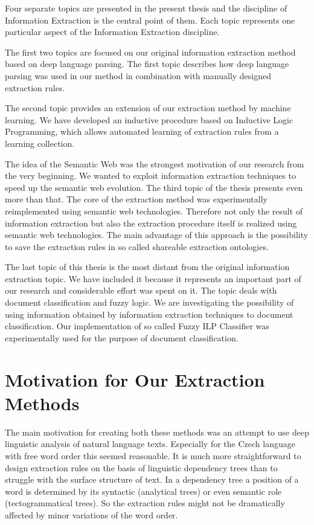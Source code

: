 
Four separate topics are presented in the present thesis and the discipline of Information Extraction is the central point of them. Each topic represents one particular aspect of the Information Extraction discipline.

The first two topics are focused on our original information extraction method based on deep language parsing. The first topic describes how deep language parsing was used in our method in combination with manually designed extraction rules.

The second topic provides an extension of our extraction method by machine learning. We have developed an inductive procedure based on Inductive Logic Programming, which allows automated learning of extraction rules from a learning collection.

The idea of the Semantic Web was the strongest motivation of our research from the very beginning. We wanted to exploit information extraction techniques to speed up the semantic web evolution. The third topic of the thesis presents even more than that. The core of the extraction method was experimentally reimplemented using semantic web technologies. Therefore not only the result of information extraction but also the extraction procedure itself is realized using semantic web technologies. The main advantage of this approach is the possibility to save the extraction rules in so called shareable extraction ontologies.

The last topic of this thesis is the most distant from the original information extraction topic. We have included it because it represents an important part of our research and considerable effort was spent on it. The topic deals with document classification and fuzzy logic. We are investigating the possibility of using information obtained by information extraction techniques to document classification. Our implementation of so called Fuzzy ILP Classifier was experimentally used for the purpose of document classification.

\section{Motivation for Our Extraction Methods}

The main motivation for creating both these methods was an attempt to use deep linguistic analysis of natural language texts. Especially for the Czech language with free word order this seemed reasonable. It is much more straightforward to design extraction rules on the basis of linguistic dependency trees than to struggle with the surface structure of text. In a dependency tree a position of a word is determined by its syntactic (analytical trees) or even semantic role (tectogrammatical trees). So the extraction rules might not be dramatically affected by minor variations of the word order.





